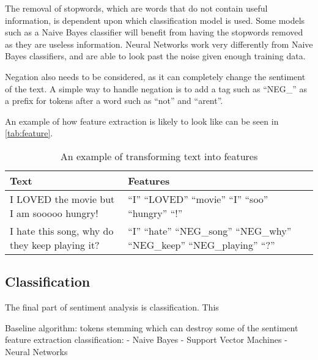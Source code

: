 The removal of stopwords, which are words that do not contain useful
information, is dependent upon which classification model is used. Some models
such as a Naive Bayes classifier will benefit from having the stopwords removed
as they are useless information. Neural Networks work very differently from
Naive Bayes classifiers, and are able to look past the noise given enough
training data.\nl

Negation also needs to be considered, as it can completely change the sentiment
of the text. A simple way to handle negation is to add a tag such as ``NEG\_'' as
a prefix for tokens after a word such as ``not'' and ``arent''.\nl 

An example of how feature extraction is likely to look like can be seen in
\autoref{tab:feature}.

\begin{table}[H]
\centering
\begin{tabular}{|p{6cm}|p{8cm}|}
\hline
Text & Features \\ \hline
I LOVED the movie but I am sooooo hungry! & 
``I'' ``LOVED'' ``movie'' ``I'' ``soo'' ``hungry'' ``!''
\\ \hline 
I hate this song, why do they keep playing it? &
``I'' ``hate'' ``NEG\_song'' ``NEG\_why'' ``NEG\_keep'' ``NEG\_playing'' ``?''  
\\ \hline
\end{tabular}
\caption{An example of transforming text into features}
\label{tab:feature}
\end{table}


\subsection{Classification}

The final part of sentiment analysis is classification. This 


Baseline algorithm:
tokens
stemming which can destroy some of the sentiment
feature extraction
classification:
- Naive Bayes
- Support Vector Machines
- Neural Networks

